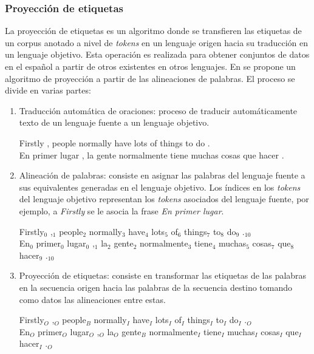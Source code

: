\documentclass{rcci} %
\begin{document}
\subsubsection*{Proyecci\'on de etiquetas} %

La proyecci\'on de etiquetas es un algoritmo donde se 
transfieren las etiquetas de un corpus anotado a nivel de \textit{tokens} en un lenguaje origen hacia su traducci\'on en un
lenguaje objetivo. Esta operaci\'on es realizada para obtener conjuntos de datos en el espa\~nol a partir de otros 
existentes en otros lenguajes. En \citep{eger2018cross} se propone un algoritmo de proyecci\'on a partir de las alineaciones de 
palabras. El proceso se divide en varias partes:

\begin{enumerate}
	\item Traducci\'on autom\'atica de oraciones: proceso de
	traducir autom\'aticamente texto de un lenguaje fuente a un lenguaje objetivo.
	\begin{adjustwidth}{25pt}{25pt}
		Firstly , people normally have lots of things to do . \\
		En primer lugar , la gente normalmente tiene muchas cosas que hacer .
	\end{adjustwidth}
	\item Alineaci\'on de palabras: consiste en asignar las palabras del lenguaje fuente
	a sus equivalentes generadas en el lenguaje objetivo. Los \'indices en los \emph{tokens} del lenguaje objetivo representan 
	los \emph{tokens} asociados del lenguaje fuente, por ejemplo, a \emph{Firstly} se le asocia la frase \emph{En primer lugar}.
	\begin{adjustwidth}{25pt}{25pt}
		Firstly$_0$ ,$_1$ people$_2$ normally$_3$ have$_4$ lots$_5$ of$_6$ things$_7$ to$_8$ do$_9$ .$_{10}$ \\
		En$_0$ primer$_0$ lugar$_0$ ,$_1$ la$_2$ gente$_2$ normalmente$_3$ tiene$_4$ muchas$_5$ cosas$_7$ que$_8$ hacer$_9$ .$_{10}$
	\end{adjustwidth}
	\item Proyecci\'on de etiquetas: consiste en transformar las etiquetas de las palabras en la secuencia origen
	hacia las palabras de la secuencia destino tomando como datos las alineaciones entre estas.
	\begin{adjustwidth}{25pt}{25pt}
		Firstly$_O$ ,$_O$ people$_B$ normally$_I$ have$_I$ lots$_I$ of$_I$ things$_I$ to$_I$ do$_I$ .$_O$ \\
		En$_O$ primer$_O$ lugar$_O$ ,$_O$ la$_O$ gente$_B$ normalmente$_I$ tiene$_I$ muchas$_I$ cosas$_I$ que$_I$ hacer$_I$ .$_O$
	\end{adjustwidth}
\end{enumerate}
\end{document}
